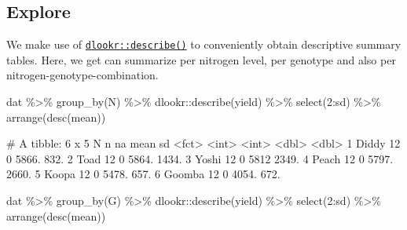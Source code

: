 \documentclass[
  letterpaper,
  DIV=11,
  numbers=noendperiod]{scrartcl}
\newenvironment{Shaded}{\begin{snugshade}}{\end{snugshade}}
\newcommand{\DecValTok}[1]{\textcolor[rgb]{0.68,0.00,0.00}{#1}}
\newcommand{\FunctionTok}[1]{\textcolor[rgb]{0.28,0.35,0.67}{#1}}
\newcommand{\NormalTok}[1]{\textcolor[rgb]{0.00,0.23,0.31}{#1}}
\newcommand{\SpecialCharTok}[1]{\textcolor[rgb]{0.37,0.37,0.37}{#1}}
\begin{document}
\hypertarget{explore}{%
\subsection{Explore}\label{explore}}

We make use of
\href{../../summaryarticles/usefulthings.qmd\#dlookr}{\texttt{dlookr::describe()}}
to conveniently obtain descriptive summary tables. Here, we get can
summarize per nitrogen level, per genotype and also per
nitrogen-genotype-combination.

\begin{Shaded}
\begin{Highlighting}[]
\NormalTok{dat }\SpecialCharTok{\%\textgreater{}\%} 
  \FunctionTok{group\_by}\NormalTok{(N) }\SpecialCharTok{\%\textgreater{}\%} 
\NormalTok{  dlookr}\SpecialCharTok{::}\FunctionTok{describe}\NormalTok{(yield) }\SpecialCharTok{\%\textgreater{}\%} 
  \FunctionTok{select}\NormalTok{(}\DecValTok{2}\SpecialCharTok{:}\NormalTok{sd) }\SpecialCharTok{\%\textgreater{}\%}
  \FunctionTok{arrange}\NormalTok{(}\FunctionTok{desc}\NormalTok{(mean))}
\end{Highlighting}
\end{Shaded}

\begin{Shaded}
\begin{Highlighting}[]
\NormalTok{\# A tibble: 6 x 5}
\NormalTok{  N          n    na  mean    sd}
\NormalTok{  \textless{}fct\textgreater{}  \textless{}int\textgreater{} \textless{}int\textgreater{} \textless{}dbl\textgreater{} \textless{}dbl\textgreater{}}
\NormalTok{1 Diddy     12     0 5866.  832.}
\NormalTok{2 Toad      12     0 5864. 1434.}
\NormalTok{3 Yoshi     12     0 5812  2349.}
\NormalTok{4 Peach     12     0 5797. 2660.}
\NormalTok{5 Koopa     12     0 5478.  657.}
\NormalTok{6 Goomba    12     0 4054.  672.}
\end{Highlighting}
\end{Shaded}

\begin{Shaded}
\begin{Highlighting}[]
\NormalTok{dat }\SpecialCharTok{\%\textgreater{}\%} 
  \FunctionTok{group\_by}\NormalTok{(G) }\SpecialCharTok{\%\textgreater{}\%} 
\NormalTok{  dlookr}\SpecialCharTok{::}\FunctionTok{describe}\NormalTok{(yield) }\SpecialCharTok{\%\textgreater{}\%} 
  \FunctionTok{select}\NormalTok{(}\DecValTok{2}\SpecialCharTok{:}\NormalTok{sd) }\SpecialCharTok{\%\textgreater{}\%}
  \FunctionTok{arrange}\NormalTok{(}\FunctionTok{desc}\NormalTok{(mean))}
\end{Highlighting}
\end{Shaded}
\end{document}
